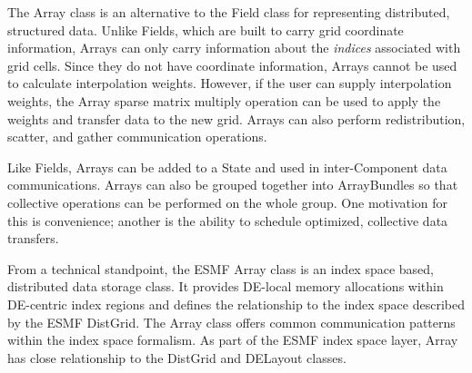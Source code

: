 %

The Array class is an alternative to the Field class for representing 
distributed, structured data.  Unlike Fields, which are built to carry 
grid coordinate information, Arrays can only carry information about the 
{\it indices} associated with grid cells.  Since they do not have coordinate 
information, Arrays cannot be used to calculate interpolation weights.  
However, if the user can supply interpolation weights, the Array sparse 
matrix multiply operation can be used to apply the weights and transfer 
data to the new grid.  Arrays can also perform redistribution, scatter, 
and gather communication operations.

Like Fields, Arrays can be added to a State and used in inter-Component 
data communications.  Arrays can also be grouped together into ArrayBundles 
so that collective operations can be performed on the whole group.  One 
motivation for this is convenience; another is the ability to schedule 
optimized, collective data transfers.   

From a technical standpoint, the ESMF Array class is an index space 
based, distributed data storage class. It provides DE-local memory allocations 
within DE-centric index regions and defines the relationship to the index 
space described by the ESMF DistGrid. The Array class offers common 
communication patterns within the index space formalism. As part of the ESMF 
index space layer, Array has close relationship to the DistGrid and DELayout 
classes.
